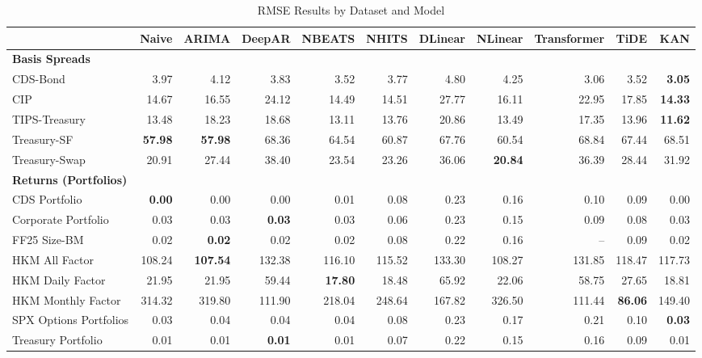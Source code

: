 
\begin{table}[htbp]
\centering
\caption{RMSE Results by Dataset and Model}
\label{tab:rmse_results}
\scriptsize
\setlength{\tabcolsep}{1.5pt}
\renewcommand{\arraystretch}{0.9}
\begin{tabular}{@{}lrrrrrrrrrr@{}}
\toprule
 & Naive & ARIMA & DeepAR & NBEATS & NHITS & DLinear & NLinear & Transformer & TiDE & KAN \\
\midrule
\multicolumn{11}{l}{\textbf{Basis Spreads}} \\
CDS-Bond & 3.97 & 4.12 & 3.83 & 3.52 & 3.77 & 4.80 & 4.25 & 3.06 & 3.52 & \textbf{3.05} \\
CIP & 14.67 & 16.55 & 24.12 & 14.49 & 14.51 & 27.77 & 16.11 & 22.95 & 17.85 & \textbf{14.33} \\
TIPS-Treasury & 13.48 & 18.23 & 18.68 & 13.11 & 13.76 & 20.86 & 13.49 & 17.35 & 13.96 & \textbf{11.62} \\
Treasury-SF & \textbf{57.98} & \textbf{57.98} & 68.36 & 64.54 & 60.87 & 67.76 & 60.54 & 68.84 & 67.44 & 68.51 \\
Treasury-Swap & 20.91 & 27.44 & 38.40 & 23.54 & 23.26 & 36.06 & \textbf{20.84} & 36.39 & 28.44 & 31.92 \\
\midrule
\multicolumn{11}{l}{\textbf{Returns (Portfolios)}} \\
CDS Portfolio & \textbf{0.00} & 0.00 & 0.00 & 0.01 & 0.08 & 0.23 & 0.16 & 0.10 & 0.09 & 0.00 \\
Corporate Portfolio & 0.03 & 0.03 & \textbf{0.03} & 0.03 & 0.06 & 0.23 & 0.15 & 0.09 & 0.08 & 0.03 \\
FF25 Size-BM & 0.02 & \textbf{0.02} & 0.02 & 0.02 & 0.08 & 0.22 & 0.16 & -- & 0.09 & 0.02 \\
HKM All Factor & 108.24 & \textbf{107.54} & 132.38 & 116.10 & 115.52 & 133.30 & 108.27 & 131.85 & 118.47 & 117.73 \\
HKM Daily Factor & 21.95 & 21.95 & 59.44 & \textbf{17.80} & 18.48 & 65.92 & 22.06 & 58.75 & 27.65 & 18.81 \\
HKM Monthly Factor & 314.32 & 319.80 & 111.90 & 218.04 & 248.64 & 167.82 & 326.50 & 111.44 & \textbf{86.06} & 149.40 \\
SPX Options Portfolios & 0.03 & 0.04 & 0.04 & 0.04 & 0.08 & 0.23 & 0.17 & 0.21 & 0.10 & \textbf{0.03} \\
Treasury Portfolio & 0.01 & 0.01 & \textbf{0.01} & 0.01 & 0.07 & 0.22 & 0.15 & 0.16 & 0.09 & 0.01 \\

\end{tabular}
\end{table}
